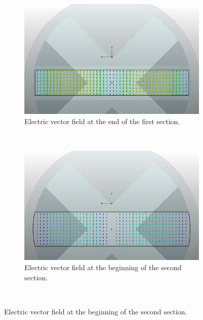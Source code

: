 \documentclass[english,twoside]{article}
\begin{document}
	\newpage
	\begin{landscape}
		\begin{figure}
			\centering
			\begin{subfigure}[b]{0.45\textwidth}
				\includegraphics[width=\textwidth]{figures/marie_s1}
				\caption{Electric vector field at the end of the first section.}
			\end{subfigure}
			~
			\begin{subfigure}[b]{0.45\textwidth}
				\includegraphics[width=\textwidth]{figures/marie_s3}
				\caption{Electric vector field at the beginning of the second section.}
			\end{subfigure}
			\vspace{10pt}\\
			

\end{figure}
\end{landscape}
\end{document}

